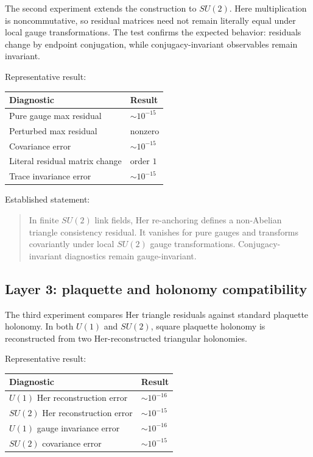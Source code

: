 \documentclass[11pt]{article}
\newcommand{\Uone}{U(1)}
\newcommand{\Sutwo}{SU(2)}
\begin{document}
The second experiment extends the construction to \(\Sutwo\).  Here multiplication is noncommutative, so residual matrices need not remain literally equal under local gauge transformations.  The test confirms the expected behavior: residuals change by endpoint conjugation, while conjugacy-invariant observables remain invariant.

Representative result:
\begin{center}
\begin{tabular}{ll}
\toprule
Diagnostic & Result \\
\midrule
Pure gauge max residual & \(\sim 10^{-15}\) \\
Perturbed max residual & nonzero \\
Covariance error & \(\sim 10^{-15}\) \\
Literal residual matrix change & order \(1\) \\
Trace invariance error & \(\sim 10^{-15}\) \\
\bottomrule
\end{tabular}
\end{center}

Established statement:
\begin{quote}
In finite \(\Sutwo\) link fields, Her re-anchoring defines a non-Abelian triangle consistency residual.  It vanishes for pure gauges and transforms covariantly under local \(\Sutwo\) gauge transformations.  Conjugacy-invariant diagnostics remain gauge-invariant.
\end{quote}

\subsection{Layer 3: plaquette and holonomy compatibility}

The third experiment compares Her triangle residuals against standard plaquette holonomy.  In both \(\Uone\) and \(\Sutwo\), square plaquette holonomy is reconstructed from two Her-reconstructed triangular holonomies.

Representative result:
\begin{center}
\begin{tabular}{ll}
\toprule
Diagnostic & Result \\
\midrule
\(\Uone\) Her reconstruction error & \(\sim 10^{-16}\) \\
\(\Sutwo\) Her reconstruction error & \(\sim 10^{-15}\) \\
\(\Uone\) gauge invariance error & \(\sim 10^{-16}\) \\
\(\Sutwo\) covariance error & \(\sim 10^{-15}\) \\
\bottomrule
\end{tabular}
\end{center}
\end{document}
